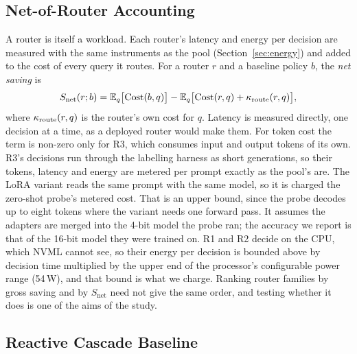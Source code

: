 \subsection{Net-of-Router Accounting}
\label{sec:net}

A router is itself a workload. Each router's latency and energy per
decision are measured with the same instruments as the pool
(Section~\ref{sec:energy}) and added to the cost of every query it routes.
For a router $r$ and a baseline policy $b$, the \emph{net saving} is
\begin{equation}
  S_{\mathrm{net}}(r; b) =
    \mathbb{E}_q\bigl[\mathrm{Cost}(b, q)\bigr]
  - \mathbb{E}_q\bigl[\mathrm{Cost}(r, q) + \kappa_{\mathrm{route}}(r, q)\bigr],
  \label{eq:netsaving}
\end{equation}
where $\kappa_{\mathrm{route}}(r, q)$ is the router's own cost for $q$.
Latency is measured directly, one decision at a time, as a deployed router
would make them. For token cost the term is non-zero only for R3, which
consumes input and output tokens of its own. R3's decisions run through the
labelling harness as short generations, so their tokens, latency and energy
are metered per prompt exactly as the pool's are. The LoRA variant reads
the same prompt with the same model, so it is charged the zero-shot probe's
metered cost. That is an upper bound, since the probe decodes up to eight
tokens where the variant needs one forward pass. It assumes the adapters
are merged into the 4-bit model the probe ran; the accuracy we report is
that of the 16-bit model they were trained on. R1 and R2 decide on the CPU,
which NVML cannot see, so their energy
per decision is bounded above by decision time multiplied by the upper
end of the processor's configurable power range (54\,W), and that bound is
what we charge.
Ranking router families by gross saving and by $S_{\mathrm{net}}$ need not
give the same order, and testing whether it does is one of the aims of the
study.

\subsection{Reactive Cascade Baseline}
\label{sec:cascade}

